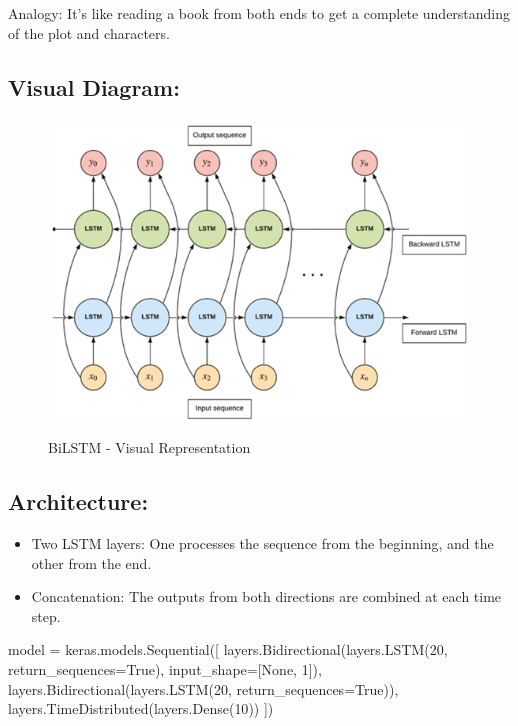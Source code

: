 \documentclass[
  letterpaper,
  DIV=11,
  numbers=noendperiod]{scrreprt}
\newenvironment{Shaded}{\begin{snugshade}}{\end{snugshade}}
\newcommand{\DecValTok}[1]{\textcolor[rgb]{0.68,0.00,0.00}{#1}}
\newcommand{\NormalTok}[1]{\textcolor[rgb]{0.00,0.23,0.31}{#1}}
\newcommand{\OperatorTok}[1]{\textcolor[rgb]{0.37,0.37,0.37}{#1}}
\newcommand{\VariableTok}[1]{\textcolor[rgb]{0.07,0.07,0.07}{#1}}
\providecommand{\tightlist}{%
  \setlength{\itemsep}{0pt}\setlength{\parskip}{0pt}}\usepackage{longtable,booktabs,array}
\begin{document}
Analogy: It's like reading a book from both ends to get a complete
understanding of the plot and characters.

\subsection{Visual Diagram:}\label{visual-diagram-2}

\begin{figure}[H]

{\centering \includegraphics[width=0.8\linewidth,height=\textheight,keepaspectratio]{chapter11_bilstm.png}

}

\caption{BiLSTM - Visual Representation}

\end{figure}%

\subsection{Architecture:}\label{architecture}

\begin{itemize}
\tightlist
\item
  Two LSTM layers: One processes the sequence from the beginning, and
  the other from the end.
\item
  Concatenation: The outputs from both directions are combined at each
  time step.
\end{itemize}

\begin{Shaded}
\begin{Highlighting}[]
\NormalTok{model }\OperatorTok{=}\NormalTok{ keras.models.Sequential([}
\NormalTok{    layers.Bidirectional(layers.LSTM(}\DecValTok{20}\NormalTok{, return\_sequences}\OperatorTok{=}\VariableTok{True}\NormalTok{), input\_shape}\OperatorTok{=}\NormalTok{[}\VariableTok{None}\NormalTok{, }\DecValTok{1}\NormalTok{]),}
\NormalTok{    layers.Bidirectional(layers.LSTM(}\DecValTok{20}\NormalTok{, return\_sequences}\OperatorTok{=}\VariableTok{True}\NormalTok{)),}
\NormalTok{    layers.TimeDistributed(layers.Dense(}\DecValTok{10}\NormalTok{))}
\NormalTok{])}
\end{Highlighting}
\end{Shaded}
\end{document}
